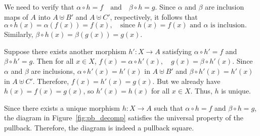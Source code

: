 We need to verify that
$
\alpha \circ h = f \quad \text{and} \quad \beta \circ h = g.
$
Since \( \alpha \) and \( \beta \) are inclusion maps of \( A \) into \( A \uplus B' \) and \( A \uplus C' \), respectively, it follows that
$
\alpha \circ h(x) = \alpha(f(x)) = f(x), \quad \text{since } h(x) = f(x) \text{ and } \alpha \text{ is inclusion}.
$
Similarly,
$
\beta \circ h(x) = \beta(g(x)) = g(x).
$

Suppose there exists another morphism \( h': X \to A \) satisfying \( \alpha \circ h' = f \) and \( \beta \circ h' = g \). Then for all \( x \in X \),
$
f(x) = \alpha \circ h'(x), \quad g(x) = \beta \circ h'(x).
$
Since \( \alpha \) and \( \beta \) are inclusions, \( \alpha \circ h'(x) = h'(x) \) in \( A \uplus B' \) and \( \beta \circ h'(x) = h'(x) \) in \( A \uplus C' \). Therefore,
$
f(x) = h'(x) = g(x).
$
But we already have \( h(x) = f(x) = g(x) \), so \( h'(x) = h(x) \) for all \( x \in X \). Thus, \( h \) is unique.

Since there exists a unique morphism \( h: X \to A \) such that \( \alpha \circ h = f \) and \( \beta \circ h = g \), the diagram in Figure~\ref{fig:pb_decomp} satisfies the universal property of the pullback. Therefore, the diagram is indeed a pullback square.
